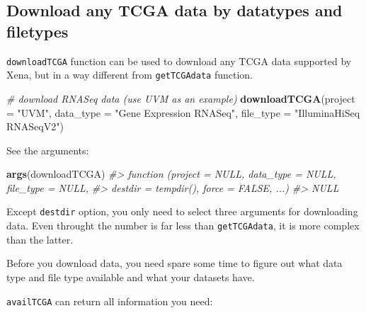 \documentclass[nofonts,]{tufte-handout}
\newenvironment{Shaded}{\begin{snugshade}}{\end{snugshade}}
\newcommand{\CommentTok}[1]{\textcolor[rgb]{0.56,0.35,0.01}{\textit{#1}}}
\newcommand{\DataTypeTok}[1]{\textcolor[rgb]{0.13,0.29,0.53}{#1}}
\newcommand{\KeywordTok}[1]{\textcolor[rgb]{0.13,0.29,0.53}{\textbf{#1}}}
\newcommand{\NormalTok}[1]{#1}
\newcommand{\StringTok}[1]{\textcolor[rgb]{0.31,0.60,0.02}{#1}}
\begin{document}
\hypertarget{download-any-tcga-data-by-datatypes-and-filetypes}{%
\subsection{Download any TCGA data by datatypes and
filetypes}\label{download-any-tcga-data-by-datatypes-and-filetypes}}

\texttt{downloadTCGA} function can be used to download any TCGA data
supported by Xena, but in a way different from \texttt{getTCGAdata}
function.

\begin{Shaded}
\begin{Highlighting}[]
\CommentTok{# download RNASeq data (use UVM as an example)}
\KeywordTok{downloadTCGA}\NormalTok{(}\DataTypeTok{project =} \StringTok{"UVM"}\NormalTok{, }\DataTypeTok{data_type =} \StringTok{"Gene Expression RNASeq"}\NormalTok{, }
    \DataTypeTok{file_type =} \StringTok{"IlluminaHiSeq RNASeqV2"}\NormalTok{)}
\end{Highlighting}
\end{Shaded}

See the arguments:

\begin{Shaded}
\begin{Highlighting}[]
\KeywordTok{args}\NormalTok{(downloadTCGA)}
\CommentTok{#> function (project = NULL, data_type = NULL, file_type = NULL, }
\CommentTok{#>     destdir = tempdir(), force = FALSE, ...) }
\CommentTok{#> NULL}
\end{Highlighting}
\end{Shaded}

Except \texttt{destdir} option, you only need to select three arguments
for downloading data. Even throught the number is far less than
\texttt{getTCGAdata}, it is more complex than the latter.

Before you download data, you need spare some time to figure out what
data type and file type available and what your datasets have.

\texttt{availTCGA} can return all information you need:
\end{document}
